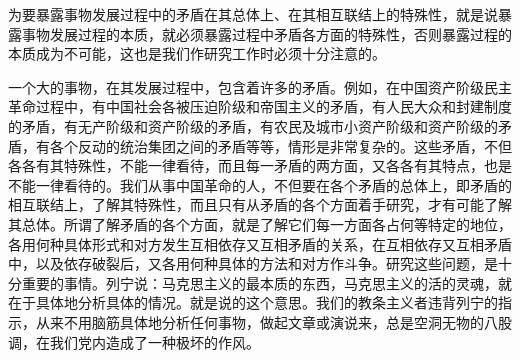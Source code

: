 \documentclass[UTF8, 12pt, a4paper]{ctexrep}
\begin{document}
为要暴露事物发展过程中的矛盾在其总体上、在其相互联结上的特殊性，就是说暴露事物发展过程的本质，就必须暴露过程中矛盾各方面的特殊性，否则暴露过程的本质成为不可能，这也是我们作研究工作时必须十分注意的。

一个大的事物，在其发展过程中，包含着许多的矛盾。例如，在中国资产阶级民主革命过程中，有中国社会各被压迫阶级和帝国主义的矛盾，有人民大众和封建制度的矛盾，有无产阶级和资产阶级的矛盾，有农民及城市小资产阶级和资产阶级的矛盾，有各个反动的统治集团之间的矛盾等等，情形是非常复杂的。这些矛盾，不但各各有其特殊性，不能一律看待，而且每一矛盾的两方面，又各各有其特点，也是不能一律看待的。我们从事中国革命的人，不但要在各个矛盾的总体上，即矛盾的相互联结上，了解其特殊性，而且只有从矛盾的各个方面着手研究，才有可能了解其总体。所谓了解矛盾的各个方面，就是了解它们每一方面各占何等特定的地位，各用何种具体形式和对方发生互相依存又互相矛盾的关系，在互相依存又互相矛盾中，以及依存破裂后，又各用何种具体的方法和对方作斗争。研究这些问题，是十分重要的事情。列宁说：马克思主义的最本质的东西，马克思主义的活的灵魂，就在于具体地分析具体的情况。就是说的这个意思。我们的教条主义者违背列宁的指示，从来不用脑筋具体地分析任何事物，做起文章或演说来，总是空洞无物的八股调，在我们党内造成了一种极坏的作风。
\end{document}
